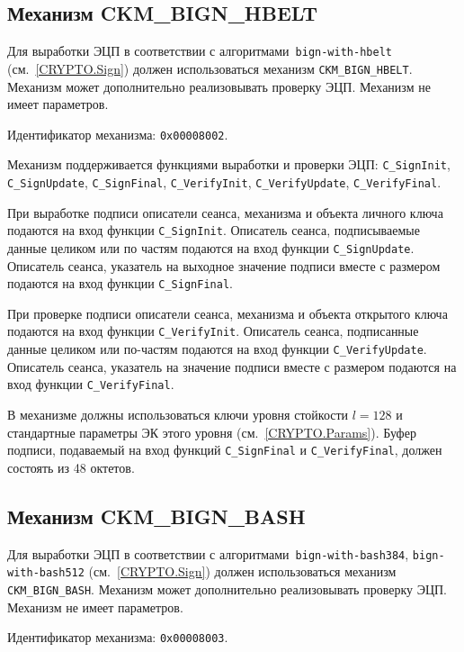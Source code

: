 \subsection{Механизм CKM\_BIGN\_HBELT}

Для выработки ЭЦП в соответствии с алгоритмами~\texttt{bign-with-hbelt} 
(см.~\ref{CRYPTO.Sign}) должен использоваться механизм \verb|CKM_BIGN_HBELT|. 
Механизм может дополнительно реализовывать проверку ЭЦП. 
%
Механизм не имеет параметров.

Идентификатор механизма: \texttt{0x00008002}.

Механизм поддерживается функциями выработки и проверки ЭЦП: 
\verb|C_SignInit|, \verb|C_SignUpdate|, \verb|C_SignFinal|, 
\verb|C_VerifyInit|, \verb|C_VerifyUpdate|, \verb|C_VerifyFinal|.

При выработке подписи описатели сеанса, механизма и объекта
личного ключа подаются на вход функции \verb|C_SignInit|.
Описатель сеанса, подписываемые данные целиком или по частям подаются
на вход функции \verb|C_SignUpdate|.
Описатель сеанса, указатель на выходное значение подписи вместе с размером
подаются на вход функции \verb|C_SignFinal|.

При проверке подписи описатели сеанса, механизма и объекта
открытого ключа подаются на вход функции \verb|C_VerifyInit|.
Описатель сеанса, подписанные данные целиком или по-частям подаются
на вход функции \verb|C_VerifyUpdate|.
Описатель сеанса, указатель на значение подписи вместе с размером
подаются на вход функции \verb|C_VerifyFinal|.

В механизме должны использоваться ключи уровня стойкости $l=128$ 
и стандартные параметры ЭК этого уровня (см.~\ref{CRYPTO.Params}).
% 
Буфер подписи, подаваемый на вход функций \verb|C_SignFinal| и 
\verb|C_VerifyFinal|, должен состоять из 48 октетов.

\subsection{Механизм CKM\_BIGN\_BASH}

Для выработки ЭЦП в соответствии с алгоритмами~\texttt{bign-with-bash384},
\texttt{bign-with-bash512} (см.~\ref{CRYPTO.Sign}) должен использоваться 
механизм \verb|CKM_BIGN_BASH|. Механизм может дополнительно реализовывать 
проверку ЭЦП.
%
Механизм не имеет параметров.

Идентификатор механизма: \texttt{0x00008003}.

